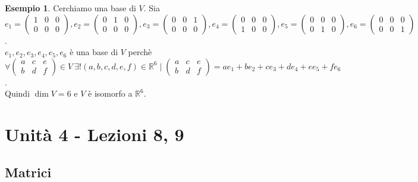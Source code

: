 \documentclass[a4paper]{article}
\theoremstyle{definition}
\newtheorem*{es}{Esempio}
\begin{document}
\begin{es}
	Cerchiamo una base di $V$. Sia $e_1 = \begin{pmatrix} 1 & 0 & 0 \\ 0 & 0 & 0 \end{pmatrix}, e_2 = \begin{pmatrix} 0 & 1 & 0 \\ 0 & 0 & 0 \end{pmatrix}, e_3 = \begin{pmatrix} 0 & 0 & 1 \\ 0 & 0 & 0 \end{pmatrix}, e_4 = \begin{pmatrix} 0 & 0 & 0 \\ 1 & 0 & 0 \end{pmatrix}, e_5 = \begin{pmatrix} 0 & 0 & 0 \\ 0 & 1 & 0 \end{pmatrix}, e_6 = \begin{pmatrix} 0 & 0 & 0 \\ 0 & 0 & 1 \end{pmatrix}$. \\
	$e_1, e_2, e_3, e_4, e_5, e_6$ è una base di $V$ perchè $\forall \begin{pmatrix}
			a & c & e \\
			b & d & f
		\end{pmatrix} \in V \ \exists! (a, b, c, d, e, f) \in \mathbb{R}^6 \mid \begin{pmatrix}
			a & c & e \\
			b & d & f
		\end{pmatrix} = ae_1 + be_2 + ce_3 + de_4 + ee_5 + fe_6$. \\
	Quindi $\dim V = 6$ e $V$ è isomorfo a $\mathbb{R}^6$.
\end{es}
\section{Unità 4 - Lezioni 8, 9}
\subsection{Matrici}
\end{document}
